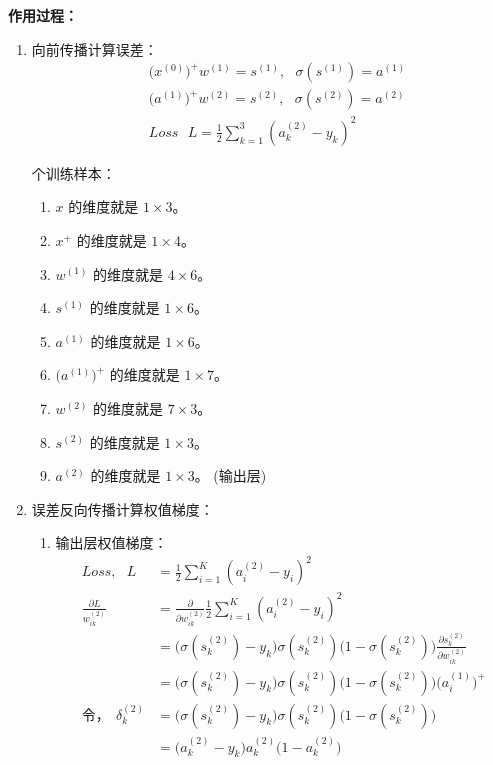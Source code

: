 \noindent\textbf{作用过程：}
\begin{enumerate}
  \item 向前传播计算误差：
  \begin{align*}
    & \big(x^{(0)}\big)^+w^{(1)}=s^{(1)},~~~\sigma(s^{(1)})=a^{(1)}\\
    & \big(a^{(1)}\big)^+w^{(2)}=s^{(2)},~~~\sigma(s^{(2)})=a^{(2)} \\
    & Loss~~~L=\frac{1}{2}\sum_{k=1}^{3}(a^{(2)}_k-y_k)^2
  \end{align*}

     个训练样本：
  \begin{enumerate}[(1)]
    \item $x$  的维度就是 $1\times 3$。
    \item $x^+$  的维度就是 $1\times 4$。
    \item $w^{(1)}$ 的维度就是 $4 \times 6$。
    \item $s^{(1)}$ 的维度就是 $1\times 6$。
    \item $a^{(1)}$ 的维度就是 $1 \times 6$。
    \item $\big(a^{(1)}\big)^+$ 的维度就是 $1 \times 7$。
    \item $w^{(2)}$ 的维度就是 $7 \times 3$。
    \item $s^{(2)}$ 的维度就是 $1\times 3$。
    \item $a^{(2)}$ 的维度就是 $1 \times 3$。 (输出层)
  \end{enumerate}
  \item 误差反向传播计算权值梯度：
  \begin{enumerate}[(1)]
    \item 输出层权值梯度：
      \begin{align*}
    Loss,~~~L&=\frac{1}{2}\sum_{i=1}^{K}(a^{(2)}_i-y_i)^2\\
    \frac{\partial L}{w^{(2)}_{ik}}&=\frac{\partial}{\partial w^{(2)}_{ik}}\frac{1}{2}\sum_{i=1}^{K}(a^{(2)}_i-y_i)^2\\
    &=\big(\sigma(s^{(2)}_k)-y_k\big)\sigma(s^{(2)}_k)\big(1-\sigma(s^{(2)}_k)\big)\frac{\partial s^{(2)}_k}{\partial w^{(2)}_{ik}}\\
    &=\big(\sigma(s^{(2)}_k)-y_k\big)\sigma(s^{(2)}_k)\big(1-\sigma(s^{(2)}_k)\big)\big(a^{(1)}_i\big)^+\\
    \text{令，}~~\delta^{(2)}_k&=\big(\sigma(s^{(2)}_k)-y_k\big)\sigma(s^{(2)}_k)\big(1-\sigma(s^{(2)}_k)\big)\\
    &=\big(a^{(2)}_k-y_k\big)a^{(2)}_k\big(1-a^{(2)}_k\big)\\

\end{align*}
\end{enumerate}
\end{enumerate}

